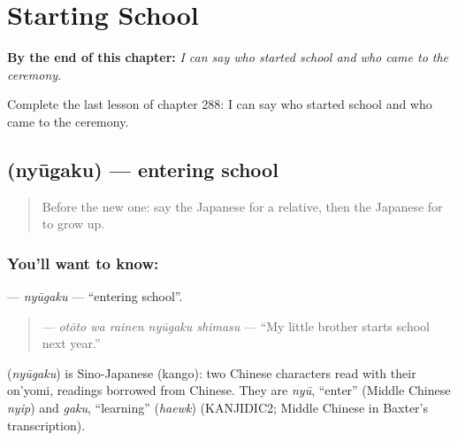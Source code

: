 
\chapter{Starting School}
\label{ch:ja-starting-school}

\begin{chapteropening}
\textbf{By the end of this chapter:} \emph{I can say who started school and who came to the ceremony.}

Complete the last lesson of chapter 288: I can say who started school and who came to the ceremony.
\end{chapteropening}

\section[\texorpdfstring{\ja{にゅうがく} (nyūgaku)}{にゅうがく (nyūgaku)}]{ (nyūgaku) — entering school}

\label{lesson:JA-C288-nyuugaku}



\begin{quote}
Before the new one: say the Japanese for a relative, then the Japanese for to grow up.
\end{quote}

\subsection*{You'll want to know: }
\textbf{} — \emph{nyūgaku} — \textquotedblleft{}entering school\textquotedblright{}.

\begin{quote}
\textbf{  } — \emph{otōto wa rainen nyūgaku shimasu} — \textquotedblleft{}My little brother starts school next year.\textquotedblright{}
\end{quote}

\begin{cousinweb}
\textbf{} (\emph{nyūgaku}) is Sino-Japanese (kango): two Chinese characters read with their on'yomi, readings borrowed from Chinese. They are \emph{nyū}, \textquotedblleft{}enter\textquotedblright{} (Middle Chinese \emph{nyip}) and \emph{gaku}, \textquotedblleft{}learning\textquotedblright{} (\emph{haewk}) (KANJIDIC2; Middle Chinese in Baxter's transcription).
\end{cousinweb}

